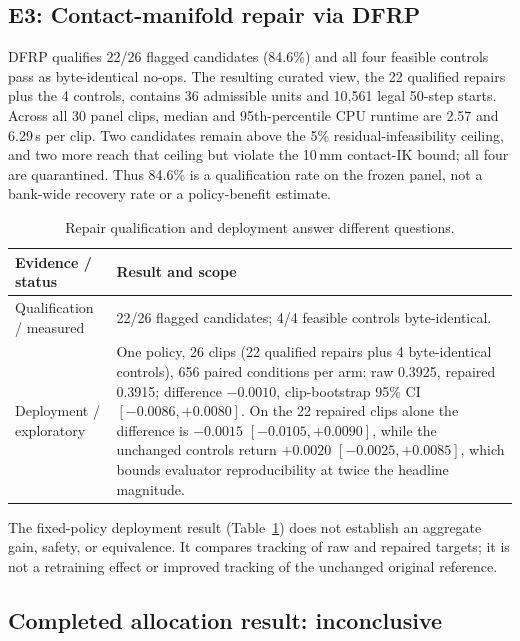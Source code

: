 \documentclass[letterpaper,10pt,conference]{ieeeconf}
\begin{document}
\subsection{E3: Contact-manifold repair via DFRP}

DFRP qualifies 22/26 flagged candidates (84.6\%) and all four feasible controls pass as
byte-identical no-ops. The resulting curated view, the 22 qualified repairs plus the 4 controls,
contains 36 admissible units and 10,561 legal 50-step starts. Across all 30 panel clips, median
and 95th-percentile CPU runtime are 2.57 and 6.29\,s per clip. Two
candidates remain above the 5\% residual-infeasibility ceiling, and two more reach that ceiling
but violate the 10\,mm contact-IK bound; all four are quarantined. Thus 84.6\% is a qualification
rate on the frozen panel, not a bank-wide recovery rate or a policy-benefit estimate.

\begin{table}[t]
\centering
\caption{Repair qualification and deployment answer different questions.}
\label{tab:repair}
\begin{tabularx}{\columnwidth}{lX}
\toprule
Evidence / status & Result and scope \\
\midrule
Qualification / measured & 22/26 flagged candidates; 4/4 feasible controls byte-identical. \\
Deployment / exploratory & One policy, 26 clips (22 qualified repairs plus 4 byte-identical
controls), 656 paired conditions per arm: raw 0.3925, repaired 0.3915; difference $-0.0010$,
clip-bootstrap 95\% CI $[-0.0086,+0.0080]$. On the 22 repaired clips alone the difference is
$-0.0015$ $[-0.0105,+0.0090]$, while the unchanged controls return $+0.0020$
$[-0.0025,+0.0085]$, which bounds evaluator reproducibility at twice the headline magnitude. \\
\bottomrule
\end{tabularx}
\end{table}
The fixed-policy deployment result (Table~\ref{tab:repair}) does not establish an
aggregate gain, safety, or equivalence. It compares tracking of raw and repaired targets;
it is not a retraining effect or improved tracking of the unchanged original reference.

\subsection{Completed allocation result: inconclusive}
\label{sec:e4results}
\end{document}
